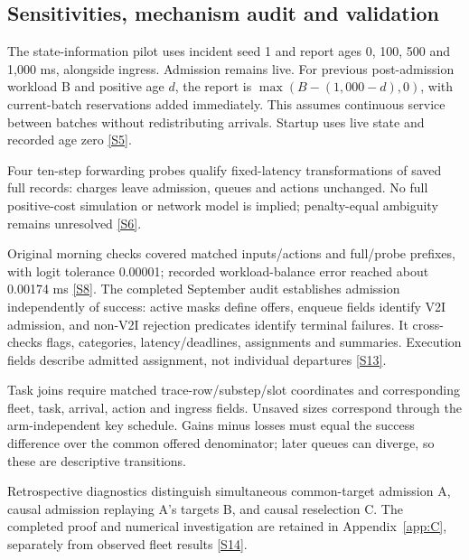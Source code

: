 \documentclass[11pt,a4paper]{article}
\begin{document}
\subsection{Sensitivities, mechanism audit and validation}\label{sec:2.7}

The state-information pilot uses incident seed 1 and report ages 0, 100, 500 and 1,000 ms, alongside ingress. Admission remains live. For previous post-admission workload B and positive age $d$, the report is $\max(B-(1{,}000-d),0)$, with current-batch reservations added immediately. This assumes continuous service between batches without redistributing arrivals. Startup uses live state and recorded age zero \hyperref[source-s5]{[S5]}.

Four ten-step forwarding probes qualify fixed-latency transformations of saved full records: charges leave admission, queues and actions unchanged. No full positive-cost simulation or network model is implied; penalty-equal ambiguity remains unresolved \hyperref[source-s6]{[S6]}.

Original morning checks covered matched inputs/actions and full/probe prefixes, with logit tolerance 0.00001; recorded workload-balance error reached about 0.00174 ms \hyperref[source-s8]{[S8]}. The completed September audit establishes admission independently of success: active masks define offers, enqueue fields identify V2I admission, and non-V2I rejection predicates identify terminal failures. It cross-checks flags, categories, latency/deadlines, assignments and summaries. Execution fields describe admitted assignment, not individual departures \hyperref[source-s13]{[S13]}.

Task joins require matched trace-row/substep/slot coordinates and corresponding fleet, task, arrival, action and ingress fields. Unsaved sizes correspond through the arm-independent key schedule. Gains minus losses must equal the success difference over the common offered denominator; later queues can diverge, so these are descriptive transitions.

Retrospective diagnostics distinguish simultaneous common-target admission A, causal admission replaying A's targets B, and causal reselection C. The completed proof and numerical investigation are retained in Appendix~\ref{app:C}, separately from observed fleet results \hyperref[source-s14]{[S14]}.
\end{document}

